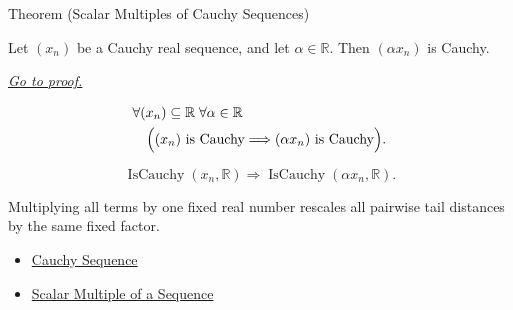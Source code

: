 
\begin{theorembox}{Theorem (Scalar Multiples of Cauchy Sequences)}
\begin{theorem}
\label{thm:scalar-multiple-cauchy-sequence}
Let $(x_n)$ be a Cauchy real sequence, and let $\alpha\in\mathbb{R}$.
Then $(\alpha x_n)$ is Cauchy.

\smallskip
\noindent
\hyperref[prf:scalar-multiple-cauchy-sequence]{\textit{Go to proof.}}
\end{theorem}
\end{theorembox}

\begin{remark*}
\[
\begin{aligned}
&\forall (x_n)\subseteq\mathbb{R}\;\forall \alpha\in\mathbb{R}\\
&\quad
\Bigl(
  (x_n)\text{ is Cauchy}
  \Longrightarrow
  (\alpha x_n)\text{ is Cauchy}
\Bigr).
\end{aligned}
\]
\end{remark*}

\begin{remark*}
\[
\operatorname{IsCauchy}(x_n,\mathbb{R})
\Longrightarrow
\operatorname{IsCauchy}(\alpha x_n,\mathbb{R}).
\]
\end{remark*}

\begin{remark*}[Interpretation]
Multiplying all terms by one fixed real number rescales all pairwise tail
distances by the same fixed factor.
\end{remark*}

\begin{dependencies}
\begin{itemize}
  \item \hyperref[def:cauchy-sequence]{Cauchy Sequence}
  \item \hyperref[def:scalar-multiple-sequence]{Scalar Multiple of a Sequence}
\end{itemize}
\end{dependencies}


